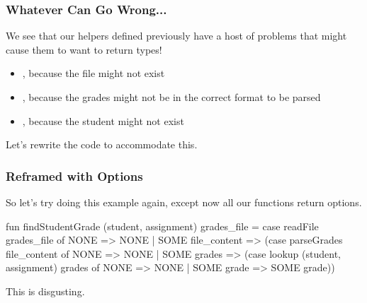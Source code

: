 \documentclass[aspectratio=169, handout]{beamer}
\begin{document}
\begin{frame}[fragile]
  \frametitle{Whatever Can Go Wrong...}

  We see that our helpers defined previously have a host of problems that
  might cause them to want to return  types!

  \pause
  \vspace{\fill}

  \begin{itemize}
    \item {}, because the file might not exist
    \item {}, because the grades might not be in the
    correct format to be parsed
    \item {}, because the student might not exist
  \end{itemize}

  \pause
  \vspace{\fill}

  Let's rewrite the code to accommodate this.
\end{frame}


\begin{frame}[fragile]
  \frametitle{Reframed with Options}

  So let's try doing this example again, except now all our functions return options.

  \pause
  \vspace{\fill}

  \begin{codeblock}
    fun findStudentGrade (student, assignment) grades_file =
      case readFile grades_file of
        NONE => NONE
      | SOME file_content =>
        (case parseGrades file_content of
          NONE => NONE
        | SOME grades =>
          (case lookup (student, assignment) grades of
            NONE => NONE
          | SOME grade => SOME grade))
  \end{codeblock}

  \pause
  \vspace{\fill}

  This is disgusting.
\end{frame}
\end{document}
